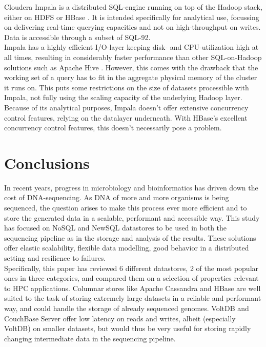 \documentclass{IEEEtran}
\begin{document}
Cloudera Impala is a distributed SQL-engine running on top of the Hadoop stack, either on HDFS or HBase \cite{cloudera_impala}. It is intended specifically for analytical use, focussing on delivering real-time querying capacities and not on high-throughput on writes.
\\Data is accessible through a subset of SQL-92.
\\Impala has a highly efficient I/O-layer keeping disk- and CPU-utilization high at all times, resulting in considerably faster performance than other SQL-on-Hadoop solutions such as Apache Hive \cite{floratou2014sql}. However, this comes with the drawback that the working set of a query has to fit in the aggregate physical memory of the cluster it runs on. This puts some restrictions on the size of datasets processible with Impala, not fully using the scaling capacity of the underlying Hadoop layer.
\\Because of its analytical purposes, Impala doesn't offer extensive concurrency control features, relying on the datalayer underneath. With HBase's excellent concurrency control features, this doesn't necessarily pose a problem.
 
\section{Conclusions}

In recent years, progress in microbiology and bioinformatics has driven down the cost of DNA-sequencing. As DNA of more and more organisms is being sequenced, the question arises to make this process ever more efficient and to store the generated data in a scalable, performant and accessible way. This study has focused on NoSQL and NewSQL datastores to be used in both the sequencing pipeline as in the storage and analysis of the results. These solutions offer elastic scalability, flexible data modelling, good behavior in a distributed setting and resilience to failures.\\
Specifically, this paper has reviewed 6 different datastores, 2 of the most popular ones in three categories, and compared them on a selection of properties relevant to HPC applications. Columnar stores like Apache Cassandra and HBase are well suited to the task of storing extremely large datasets in a reliable and performant way, and could handle the storage of already sequenced genomes. VoltDB and CouchBase Server offer low latency on reads and writes, albeit (especially VoltDB) on smaller datasets, but would thus be very useful for storing rapidly changing intermediate data in the sequencing pipeline. %

{}

\end{document}
